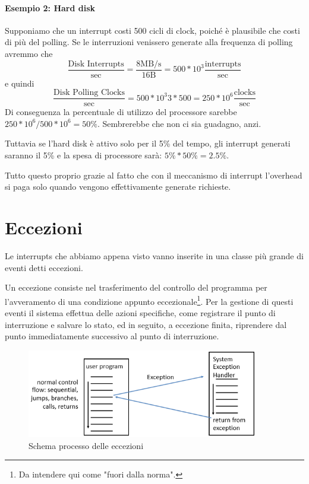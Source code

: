 \documentclass[class=book, crop=false, oneside]{standalone}
\begin{document}
\paragraph{Esempio 2: Hard disk} Supponiamo che un interrupt costi 500 cicli di clock, poiché è plausibile che costi di più del polling.
Se le interruzioni venissero generate alla frequenza di polling avremmo che \[\frac{\textrm{Disk Interrupts}}{\textrm{sec}}=\frac{8 \textrm{MB/s}}{16\textrm{B}}=500*10^{3}\frac{\textrm{interrupts}}{\textrm{sec}}\] e quindi \[\frac{\textrm{Disk Polling Clocks}}{\textrm{sec}}=500*10^3{3}*500=250*10^{6} \frac{\textrm{clocks}}{\textrm{sec}}\] Di conseguenza la percentuale di utilizzo del processore sarebbe \(250*10^{6}/500*10^{6}= 50\%\). Sembrerebbe che non ci sia guadagno, anzi.

Tuttavia se l’hard disk è attivo solo per il 5\% del tempo, gli interrupt generati saranno il 5\% e la spesa di processore sarà: \(5\% * 50\%=2.5\%\).

Tutto questo proprio grazie al fatto che con il meccanismo di interrupt l’overhead si paga solo quando vengono effettivamente generate richieste.

\section{Eccezioni}
Le interrupts che abbiamo appena visto vanno inserite in una classe più grande di eventi detti eccezioni.

Un eccezione consiste nel trasferimento del controllo del programma per l'avveramento di una condizione appunto eccezionale\footnote{Da intendere qui come "fuori dalla norma".}.
Per la gestione di questi eventi il sistema effettua delle azioni specifiche, come registrare il punto di interruzione e salvare lo stato, ed in seguito, a eccezione finita, riprendere dal punto immediatamente successivo al punto di interruzione.

\begin{figure}[H]
	\centering
	\includegraphics[width=0.9\textwidth,keepaspectratio]{schema-eccezioni}
	\caption{Schema processo delle eccezioni}
\end{figure}
\end{document}
